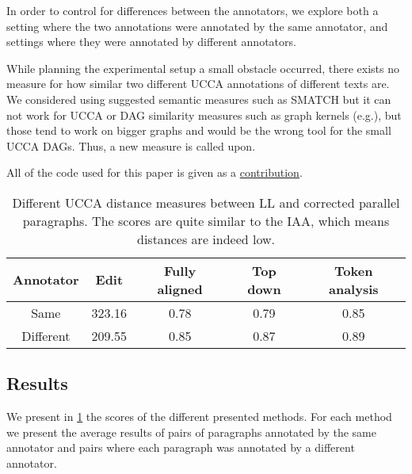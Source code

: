 		
		
		
		
		
		
		
		
		In order to control for differences between the annotators, we explore both
		a setting where the two annotations were annotated by the same annotator,
		and settings where they were annotated by different annotators.
		
		
		While planning the experimental setup a small obstacle occurred,
		there exists no measure for how similar two different UCCA annotations of different texts are.
		We considered using suggested semantic measures
		such as SMATCH\cite{cai2013smatch} but it can not work for UCCA or
		DAG similarity measures such as graph kernels (e.g.\cite{kashima2003marginalized}),
		but those tend to work on bigger graphs and would be the wrong tool
		for the small UCCA DAGs. Thus, a new measure is called upon.
		
		
		All of the code used for this paper is given as a \href{link will be disclosed upon publication}{contribution}.
		\vspace*{-\baselineskip}
		\begin{table}[h!]
			\centering
			\singlespacing
			\begin{tabular}{c|c|c|c|c}
				Annotator & Edit & Fully aligned & Top down & Token analysis
				\\
				\hline
				Same & 323.16 & 0.78 & 0.79 & 0.85
				\\
				Different & 209.55 & 0.85 & 0.87 & 0.89
				\\
			\end{tabular}
			\caption{Different UCCA distance measures between LL and corrected parallel paragraphs. The scores are quite similar to the IAA, which means distances are indeed low.\label{tab:Distances}}
		\end{table}
		\vspace*{-\baselineskip}
		\subsection{Results}
		
		We present in \ref{tab:Distances} the scores of the different presented
		methods. For each method we present the average results of pairs
		of paragraphs annotated by the same annotator and pairs where each
		paragraph was annotated by a different annotator.
		
